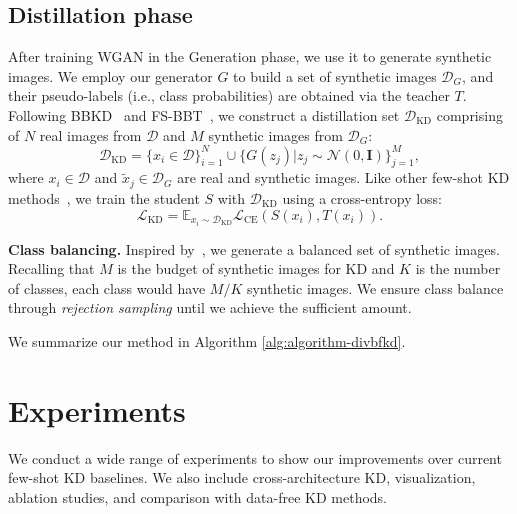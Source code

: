\documentclass[12pt, a4paper, twoside]{book}
\numberwithin{equation}{chapter}
\theoremstyle{plain}
\theoremstyle{definition}
\theoremstyle{remark}
\newenvironment{foldable}{}{}
\newcommand*{\ie}{i.e.}
\begin{document}
\subsection{Distillation phase}
\begin{foldable}
  After training WGAN in the Generation phase, we use it to generate synthetic images.
  We employ our generator $G$ to build a set of synthetic images $\mathcal{D}_G$, and their pseudo-labels (\ie, class probabilities) are obtained via the teacher $T$.
  Following BBKD~\cite{wang2020neural} and FS-BBT~\cite{nguyen2022black}, we construct a distillation set $\mathcal{D}_\text{KD}$ comprising of $N$ real images from $\mathcal{D}$ and $M$ synthetic images from $\mathcal{D}_G$:
  \begin{equation}
    \mathcal{D}_\text{KD} = {
      \{x_{i} \in \mathcal{D}\}_{i=1}^{N} \cup
      \{G(z_{j}) | z_{j} \sim \mathcal{N}(0, \mathbf{I})\}_{j=1}^{M}
    },
    \label{eq:distill-set}
  \end{equation}
  where $x_{i} \in \mathcal{D}$ and $\tilde{x}_{j} \in \mathcal{D}_G$ are real and synthetic images.
  Like other few-shot \ac{KD} methods~\cite{wang2020neural,nguyen2022black}, we train the student $S$ with $\mathcal{D}_\text{KD}$ using a cross-entropy loss:
  \begin{equation}
    \mathcal{L}_\text{KD} = \mathbb{E}_{x_{i} \sim \mathcal{D}_\text{KD}} \mathcal{L}_\text{CE}(S(x_{i}), T(x_{i})).
    \label{eq:loss-S}
  \end{equation}
\end{foldable}

\begin{foldable}
  \textbf{Class balancing.} Inspired by~\cite{chen2019data,zhang2022ideal}, we generate a balanced set of synthetic images.
  Recalling that $M$ is the budget of synthetic images for \ac{KD} and $K$ is the number of classes, each class would have $M / K$ synthetic images.
  We ensure class balance through \textit{rejection sampling} until we achieve the sufficient amount.
\end{foldable}

We summarize our method in Algorithm \ref{alg:algorithm-divbfkd}.
 \section{Experiments} \label{sec:33-research01-experiments}
\begin{foldable}
  We conduct a wide range of experiments to show our improvements over current few-shot \ac{KD} baselines.
  We also include cross-architecture \ac{KD}, visualization, ablation studies, and comparison with data-free \ac{KD} methods.
\end{foldable}
\end{document}

